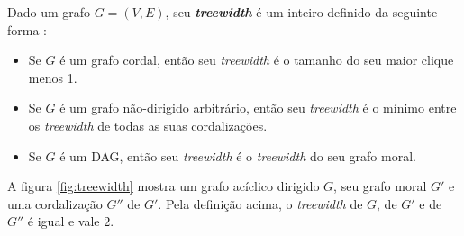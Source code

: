 Dado um grafo $G = (V, E)$, seu \textbf{\emph{treewidth}} é um inteiro definido da seguinte forma \cite{maua}:

\begin{itemize}
  \item Se $G$ é um grafo cordal, então seu \emph{treewidth} é o tamanho do seu maior clique menos 1.
  \item Se $G$ é um grafo não-dirigido arbitrário, então seu \emph{treewidth} é o mínimo entre os \emph{treewidth} de todas as suas cordalizações.
  \item Se $G$ é um DAG, então seu \emph{treewidth} é o \emph{treewidth} do seu grafo moral.
\end{itemize}

A figura \ref{fig:treewidth} mostra um grafo acíclico dirigido $G$, seu grafo moral $G'$ e uma cordalização $G''$ de $G'$. Pela definição acima, o \emph{treewidth} de $G$, de $G'$ e de $G''$ é igual e vale $2$.

